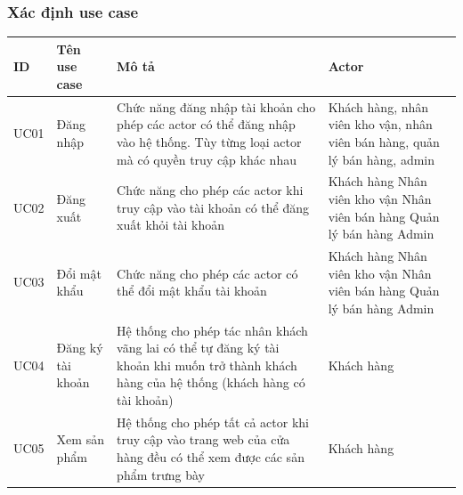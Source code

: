 \documentclass[12pt,a4paper,2sides]{report}
\begin{document}
\subsubsection{Xác định use case}

\begin{tabular}{|p{1cm}|p{3cm}|p{6cm}|p{3cm}|} 
\hline
ID   & Tên use case                           & Mô tả                                                                                                                                                                                                                                    & Actor                                                                   \\ 
\hline
UC01 & Đăng nhập                              & Chức năng đăng nhập tài khoản cho phép các actor có thể đăng nhập vào hệ thống. Tùy từng loại actor mà có quyền truy cập khác nhau                                                                                                       & Khách hàng, nhân viên kho vận, nhân viên bán hàng, quản lý bán hàng, admin  \\ 
\hline
UC02 & Đăng xuất                              & Chức năng cho phép các actor khi truy cập vào tài khoản có thể đăng xuất khỏi tài khoản                                                                                                                                                  & Khách hàng Nhân viên kho vận Nhân viên bán hàng Quản lý bán hàng Admin  \\ 
\hline
UC03 & Đổi mật khẩu                           & Chức năng cho phép các actor có thể đổi mật khẩu tài khoản                                                                                                                                                                               & Khách hàng Nhân viên kho vận Nhân viên bán hàng Quản lý bán hàng Admin  \\ 
\hline
UC04 & Đăng ký tài khoản                      & Hệ thống cho phép tác nhân khách vãng lai có thể tự đăng ký tài khoản khi muốn trở thành khách hàng của hệ thống (khách hàng có tài khoản)                                                                                               & Khách hàng                                                              \\ 
\hline
UC05 & Xem sản phẩm                           & Hệ thống cho phép tất cả actor khi truy cập vào trang web của cửa hàng đều có thể xem được các sản phẩm trưng bày                                                                                                                        & Khách hàng                                                              \\ 

\end{tabular}
\end{document}
